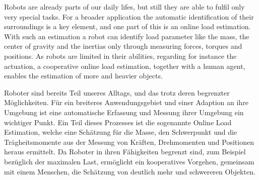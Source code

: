 \documentclass[a4paper,twoside, openright,12pt]{report}
\newenvironment{abstractpage}
  {\vspace*{\fill}\thispagestyle{empty}}
  {\vfill}%
\renewenvironment{abstract}[1]
  {\bigskip\selectlanguage{#1}%
   \begin{center}\bfseries\abstractname\end{center}}
  {\par\bigskip}
\begin{document}
	\begin{abstractpage}
		\begin{abstract}{english}
		    Robots are already parts of our daily lifes, but still they are able to fulfil only very special tasks. For a broader application the automatic identification of their surroundings is a key element, and one part of this is an online load estimation. With such an estimation a robot can identify load parameter like the mass, the center of gravity and the inertias only through measuring forces, torques and positions. As robots are limited in their abilities, regarding for instance the actuation, a cooperative online load estimation, together with a human agent, enables the estimation of more and heavier objects.
		\end{abstract}
		\vspace{2cm}
		\begin{abstract}{ngerman}
		    Roboter sind bereits Teil unseres Alltags, und das trotz deren begrenzter M\"oglichkeiten. F\"ur ein breiteres Anwendungsgebiet und einer Adaption an ihre Umgebung ist eine automatische Erfassung und Messung ihrer Umgebung ein wichtiger Punkt. Ein Teil dieses Prozesses ist die sogenannte Online Load Estimation, welche eine Sch\"atzung f\"ur die Masse, den Schwerpunkt und die Tr\"agheitsmomente aus der Messung von Kr\"aften, Drehmomenten und Positionen heraus ermittelt. Da Roboter in ihren F\"ahigkeiten begrenzt sind, zum Beispiel bez\"uglich der maximalen Last, erm\"oglicht ein kooperatives Vorgehen, gemeinsam mit einem Menschen, die Sch\"atzung von deutlich mehr und schwereren Objekten.
		\end{abstract}
	\end{abstractpage}
	
	\pagestyle{fancy}
	\tableofcontents 
	
	
	
		
	
	\cleardoublepage
	\listoffigures
	
	\cleardoublepage
	
	
\end{document}

